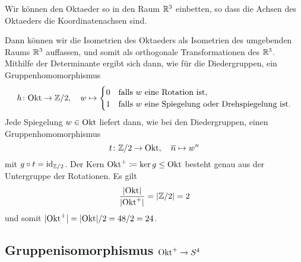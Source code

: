 Wir können den Oktaeder so in den Raum $\mathbb{R}^3$ einbetten, so dass die Achsen des Oktaeders die Koordinatenachsen sind.
\begin{center}
\end{center}
Dann können wir die Isometrien des Oktaeders als Isometrien des umgebenden Raums $\mathbb{R}^3$ auffassen, und somit als orthogonale Transformationen des $\mathbb{R}^3$.
Mithilfe der Determinante ergibt sich dann, wie für die Diedergruppen, ein Gruppenhomomorphismus
\[
          h
  \colon  \mathrm{Okt}
  \to     \mathbb{Z}/2,
  \quad   w
  \mapsto \begin{cases}
            0 & \text{falls $w$ eine Rotation ist}, \\
            1 & \text{falls $w$ eine Spiegelung oder Drehspiegelung ist}.
          \end{cases}
\]
Jede Spiegelung $w \in \mathrm{Okt}$ liefert dann, wie bei den Diedergruppen, einen Gruppenhomomorphismus
\[
          t
  \colon  \mathbb{Z}/2
  \to     \mathrm{Okt},
  \quad   \overline{n}
  \mapsto w^n
\]
mit $g \circ t = \operatorname{id}_{\mathbb{Z}/2}$.
Der Kern $\mathrm{Okt}^+ \coloneqq \ker g \leq \mathrm{Okt}$ besteht genau aus der Untergruppe der Rotationen.
Es gilt
\[
    \frac{|\mathrm{Okt}|}{|\mathrm{Okt}^+|}
  = |\mathbb{Z}/2|
  = 2
\]
und somit $|\mathrm{Okt}^+| = |\mathrm{Okt}|/2 = 48/2 = 24$.





\subsection*{Gruppenisomorphismus $\mathrm{Okt}^+ \to S^4$}


